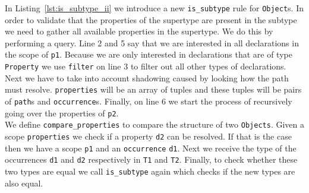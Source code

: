 \documentclass{article}
\newcommand{\ttt}[1]{\texttt{#1}}
\begin{document}
\begin{center}
    \begin{minipage}{.75\textwidth}
    
    \end{minipage}
\end{center}
\noindent
In Listing~\ref{lst:is_subtype_ii} we introduce a new \ttt{is\_subtype} rule for \ttt{Object}s.
In order to validate that the properties of the supertype are present in the subtype we need to gather all available properties in the supertype.
We do this by performing a query.
Line 2 and 5 say that we are interested in all declarations in the scope of \ttt{p1}.
Because we are only interested in declarations that are of type \ttt{Property} we use \ttt{filter} on line 3 to filter out all other types of declarations.
Next we have to take into account shadowing caused by looking how the path must resolve.
\ttt{properties} will be an array of tuples and these tuples will be pairs of \ttt{path}s and \ttt{occurrence}s.
Finally, on line 6 we start the process of recursively going over the properties of \ttt{p2}.
\\
\noindent
We define \ttt{compare\_properties} to compare the structure of two \ttt{Objects}.
Given a scope \ttt{properties} we check if a property \ttt{d2} can be resolved.
If that is the case then we have a scope \ttt{p1} and an \ttt{occurrence} \ttt{d1}.
Next we receive the type of the occurrences \ttt{d1} and \ttt{d2} respectively in \ttt{T1} and \ttt{T2}.
Finally, to check whether these two types are equal we call \ttt{is\_subtype} again which checks if the new types are also equal.



\end{document}
